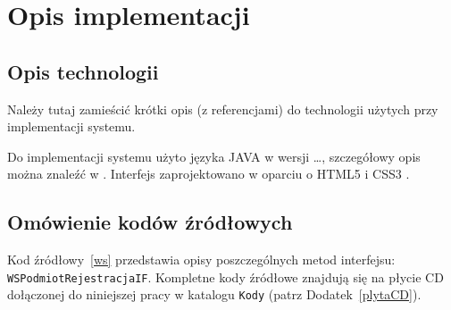 \chapter{Opis implementacji}
\thispagestyle{chapterBeginStyle}

\iffalse
\section{Opis technologii}

Należy tutaj zamieścić krótki opis (z referencjami) do technologii użytych przy implementacji systemu.

{\color{dgray}
Do implementacji systemu użyto języka JAVA w wersji \ldots, szczegółowy opis można znaleźć w \cite{Java}. Interfejs zaprojektowano w oparciu o HTML5 i CSS3 \cite{HTML-CSS}.
}

\section{Omówienie kodów źródłowych}

{\color{dgray}
Kod źródłowy~\ref{ws} przedstawia opisy poszczególnych metod interfejsu: \texttt{WSPodmiotRejestracjaIF}. Kompletne
kody źródłowe znajdują się na płycie CD dołączonej do niniejszej pracy w katalogu \texttt{Kody} (patrz Dodatek~\ref{plytaCD}).
}

